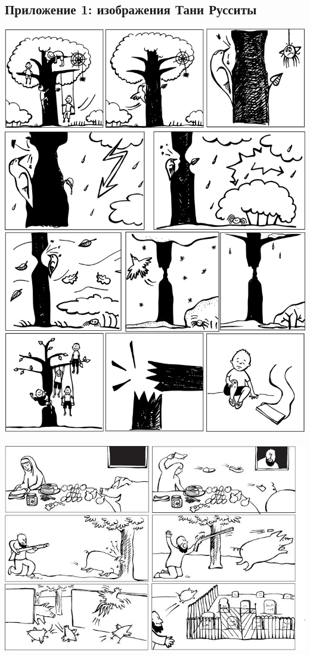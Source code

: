\subsection{Приложение 1: изображения Тани Русситы}
\noindent \includegraphics[width=\linewidth]{pauk.jpg}\\
\pagebreak\\
\includegraphics[width=\linewidth]{svinja.jpg}\\
\pagebreak

